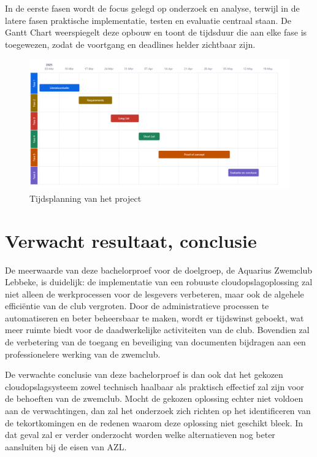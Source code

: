 In de eerste fasen wordt de focus gelegd op onderzoek en analyse, terwijl in de latere fasen praktische implementatie, testen en evaluatie centraal staan. De Gantt Chart weerspiegelt deze opbouw en toont de tijdsduur die aan elke fase is toegewezen, zodat de voortgang en deadlines helder zichtbaar zijn.
\begin{figure}[h!]
    \centering
    \includegraphics[width=.5\textwidth]{../graphics/Chart-Tijd-Visualisatie.png}
    \caption{Tijdsplanning van het project}
    \label{fig:tijdsplanning}
\end{figure}


\section{Verwacht resultaat, conclusie}%
\label{sec:verwachte_resultaten}

De meerwaarde van deze bachelorproef voor de doelgroep, de Aquarius Zwemclub Lebbeke, is duidelijk: de implementatie van een robuuste cloudopslagoplossing zal niet alleen de werkprocessen voor de lesgevers verbeteren, maar ook de algehele efficiëntie van de club vergroten. Door de administratieve processen te automatiseren en beter beheersbaar te maken, wordt er tijdswinst geboekt, wat meer ruimte biedt voor de daadwerkelijke activiteiten van de club. Bovendien zal de verbetering van de toegang en beveiliging van documenten bijdragen aan een professionelere werking van de zwemclub.

De verwachte conclusie van deze bachelorproef is dan ook dat het gekozen cloudopslagsysteem zowel technisch haalbaar als praktisch effectief zal zijn voor de behoeften van de zwemclub. Mocht de gekozen oplossing echter niet voldoen aan de verwachtingen, dan zal het onderzoek zich richten op het identificeren van de tekortkomingen en de redenen waarom deze oplossing niet geschikt bleek. In dat geval zal er verder onderzocht worden welke alternatieven nog beter aansluiten bij de eisen van AZL.
